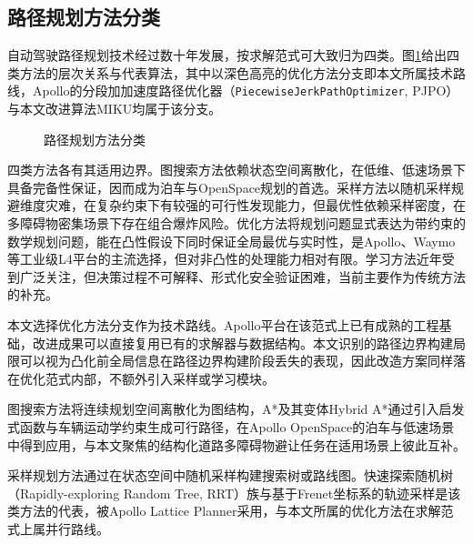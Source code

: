 \subsection{路径规划方法分类}

自动驾驶路径规划技术经过数十年发展，按求解范式可大致归为四类\cite{gonzalez2016,paden2016,katrakazas2015realtime,schwarting2018planning}。图\ref{fig:method_taxonomy}给出四类方法的层次关系与代表算法，其中以深色高亮的优化方法分支即本文所属技术路线，Apollo的分段加加速度路径优化器（\texttt{PiecewiseJerkPathOptimizer}, PJPO）与本文改进算法MIKU均属于该分支。

\begin{figure}[htbp]
\centering
{}
\caption{路径规划方法分类}
\label{fig:method_taxonomy}
\end{figure}

四类方法各有其适用边界。图搜索方法依赖状态空间离散化，在低维、低速场景下具备完备性保证，因而成为泊车与OpenSpace规划的首选。采样方法以随机采样规避维度灾难，在复杂约束下有较强的可行性发现能力，但最优性依赖采样密度，在多障碍物密集场景下存在组合爆炸风险。优化方法将规划问题显式表达为带约束的数学规划问题，能在凸性假设下同时保证全局最优与实时性，是Apollo、Waymo等工业级L4平台的主流选择，但对非凸性的处理能力相对有限。学习方法近年受到广泛关注，但决策过程不可解释、形式化安全验证困难，当前主要作为传统方法的补充。

本文选择优化方法分支作为技术路线。Apollo平台在该范式上已有成熟的工程基础，改进成果可以直接复用已有的求解器与数据结构。本文识别的路径边界构建局限可以视为凸化前全局信息在路径边界构建阶段丢失的表现，因此改造方案同样落在优化范式内部，不额外引入采样或学习模块。

图搜索方法将连续规划空间离散化为图结构，A*\cite{hart1968astar}及其变体Hybrid A*\cite{dolgov2008hybrid,dolgov2010}通过引入启发式函数与车辆运动学约束生成可行路径，在Apollo OpenSpace的泊车与低速场景中得到应用，与本文聚焦的结构化道路多障碍物避让任务在适用场景上彼此互补。

采样规划方法通过在状态空间中随机采样构建搜索树或路线图。快速探索随机树（Rapidly-exploring Random Tree, RRT）族\cite{lavalle1998rrt,karaman2011sampling,kuffner2000rrtconnect,kuwata2009rrt,urmson2008boss}与基于Frenet坐标系的轨迹采样\cite{werling2010,li2022frenet,mcnaughton2011lattice}是该类方法的代表，被Apollo Lattice Planner采用，与本文所属的优化方法在求解范式上属并行路线。

